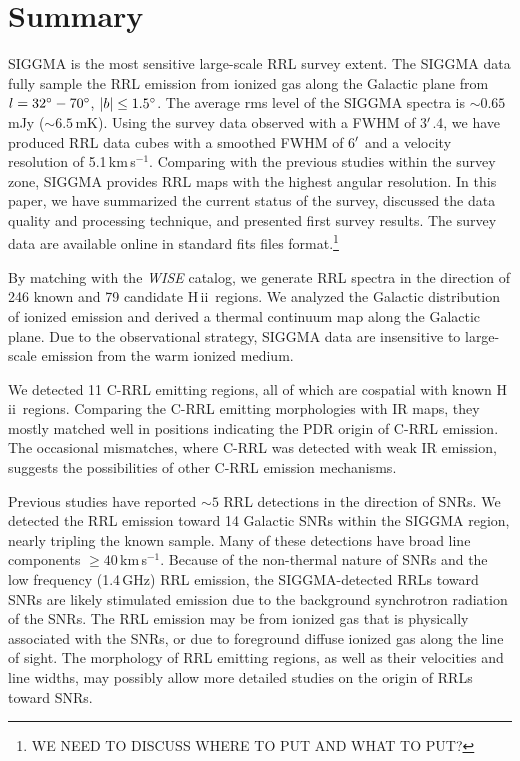 \documentclass[manuscript]{aastex61}
\newcommand{\hii}{{\rm H\,}{{\sc ii}}}
\newcommand{\kms}{\,km\,s$^{-1}$}
\begin{document}
\section{Summary} \label{sec_summ}
SIGGMA is the most sensitive large-scale RRL survey extent.
The SIGGMA data fully sample the RRL emission from ionized gas along the Galactic plane from $l=32\mbox{$^\circ$} - 70\mbox{$^\circ$}$, $|b|\le 1.5\mbox{$^\circ$}$.
The average rms level of the SIGGMA spectra is $\sim0.65$ mJy ($\sim6.5$\,mK).
Using the survey data observed with a FWHM of 3$\mbox{$^\prime$}$.4, we have produced RRL data cubes with a smoothed FWHM of 6$\mbox{$^\prime$}$ and a velocity resolution of 5.1\kms.
Comparing with the previous studies within the survey zone, SIGGMA provides RRL maps with the highest angular resolution.
In this paper, we have summarized the current status of the survey, discussed the data quality and processing technique, and presented first survey results.
The survey data are available online in standard fits files format.\footnote{WE NEED TO DISCUSS WHERE TO PUT AND WHAT TO PUT?}

By matching with the {\it WISE} catalog, we generate RRL spectra in the direction of 246 known and 79 candidate \hii\ regions.
We analyzed the Galactic distribution of ionized emission and derived a thermal continuum map along the Galactic plane.
Due to the observational strategy, SIGGMA data are insensitive to large-scale emission from the warm ionized medium.

We detected 11 C-RRL emitting regions, all of which are cospatial with known \hii\ regions.
Comparing the C-RRL emitting morphologies with IR maps, they mostly matched well in positions indicating the PDR origin of C-RRL emission.
The occasional mismatches, where C-RRL was detected with weak IR emission, suggests the possibilities of other C-RRL emission mechanisms.

Previous studies have reported $\sim5$ RRL detections in the direction of SNRs. 
We detected the RRL emission toward 14 Galactic SNRs within the SIGGMA region, nearly tripling the known sample.
Many of these detections have broad line components $\geq 40$\kms.
Because of the non-thermal nature of SNRs and the low frequency (1.4\,GHz) RRL emission, the SIGGMA-detected RRLs toward SNRs are likely stimulated emission due to the background synchrotron radiation of the SNRs.
The RRL emission may be from ionized gas that is physically associated with the SNRs, or due to foreground diffuse ionized gas along the line of sight.
The morphology of RRL emitting regions, as well as their velocities and line widths, may possibly allow more detailed studies on the origin of RRLs toward SNRs.
\end{document}

